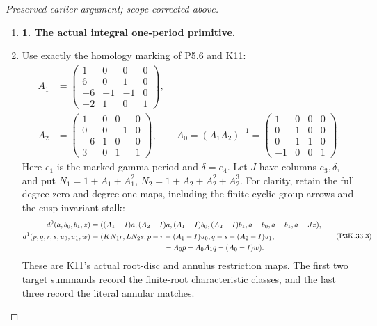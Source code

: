 \begin{proof}[Preserved earlier argument; scope corrected above]
\begin{enumerate}[label=\arabic*.]
\item \par\medskip\noindent\textbf{1. The actual integral one-period primitive.}\enspace

\item Use exactly the homology marking of P5.6 and K11:
\[
\begin{split}
 A_1&=\begin{pmatrix}
 1&0&0&0\\6&0&1&0\\-6&-1&-1&0\\-2&1&0&1
 \end{pmatrix},\\
 A_2&=\begin{pmatrix}
 1&0&0&0\\0&0&-1&0\\-6&1&0&0\\3&0&1&1
 \end{pmatrix},\qquad
 A_0=(A_1A_2)^{-1}
 =\begin{pmatrix}
 1&0&0&0\\0&1&0&0\\0&1&1&0\\-1&0&0&1
 \end{pmatrix}.
\end{split}                                                     \tag{P3K.33.2}
\]
Here \(e_1\) is the marked gamma period and \(\delta=e_4\).
Let \(J\) have columns \(e_3,\delta\), and put
\(N_1=1+A_1+A_1^2\), \(N_2=1+A_2+A_2^2+A_2^3\).
For clarity, retain the full degree-zero and degree-one maps,
including the finite cyclic group arrows and the cusp invariant stalk:
\[
\begin{split}
 d^0(a,b_0,b_1,z)={}&((A_1-I)a,(A_2-I)a,
 (A_1-I)b_0,(A_2-I)b_1,a-b_0,a-b_1,a-Jz),\\
 d^1(p,q,r,s,u_0,u_1,w)={}&(KN_1r,LN_2s,
 p-r-(A_1-I)u_0,q-s-(A_2-I)u_1,\\
 &\hspace{30mm}-A_0p-A_0A_1q-(A_0-I)w).
\end{split}                                                     \tag{P3K.33.3}
\]
These are K11's actual root-disc and annulus restriction maps.
The first two target summands record the finite-root characteristic
classes, and the last three record the literal annular matches.


\end{enumerate}
\end{proof}
